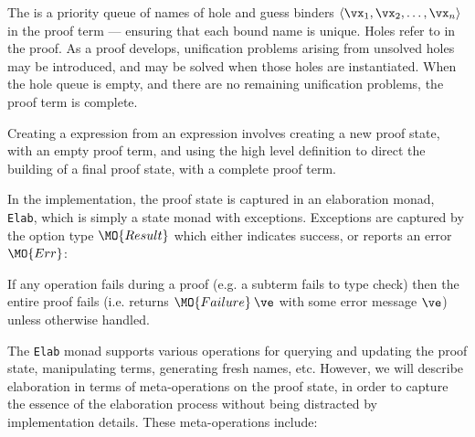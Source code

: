 The  is a priority queue of names of hole and guess binders 
$\langle\vx_1,\vx_2,\ldots,\vx_n\rangle$
in the proof term ---
ensuring that each bound name is unique. Holes refer to 
in the proof. As a proof develops, unification problems arising from unsolved
holes may be introduced, and may be solved when those holes are instantiated.
When the hole queue is empty, and there are no remaining unification 
problems, the proof term is complete.

Creating a \TT{} expression from an \Idris{} expression involves creating
a new proof state, with an empty proof term, and using the high level definition
to direct the building of a final proof state, with a complete proof term.

In the implementation, the proof state is captured in an elaboration monad,
\texttt{Elab}, which is simply a state monad with exceptions. 
Exceptions are captured by the option type $\MO{Result}$ which
either indicates success, or reports an error $\MO{Err}$:


\noindent
If any operation fails during a proof (e.g. a subterm fails to type check)
then the entire proof fails (i.e. returns $\MO{Failure}\:\ve$ with some error
message $\ve$) unless otherwise handled.

The \texttt{Elab} monad supports various operations for querying and updating
the proof state, manipulating terms, generating fresh names, etc. However, we
will describe \Idris{} elaboration in terms of meta-operations on the proof
state, in order to capture the essence of the elaboration process without being
distracted by implementation details. These meta-operations include: 


